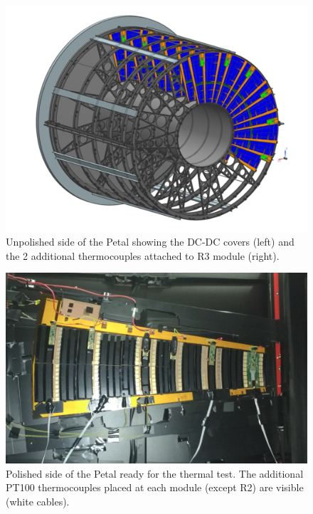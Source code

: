 		\begin{figure}[H]
			\centering
			\captionsetup{justification=centering,margin=2cm}
			\includegraphics[scale=0.35]{Figures/Chapter02/EndCap.pdf}
			\caption{Unpolished side of the Petal showing the DC-DC covers (left) and the 2 additional thermocouples attached to R3 module (right).}\label{fig2.8}
		\end{figure}
		
		\begin{figure}[H]
			\centering
			\captionsetup{justification=centering,margin=2cm}
			\includegraphics[scale=0.3]{Figures/Chapter02/petal_polished_in_chamber_zoomed.pdf}
			\caption{Polished side of the Petal ready for the thermal test. The additional PT100 thermocouples placed at each module (except R2) are visible (white cables).}\label{fig2.9}
		\end{figure}

		
